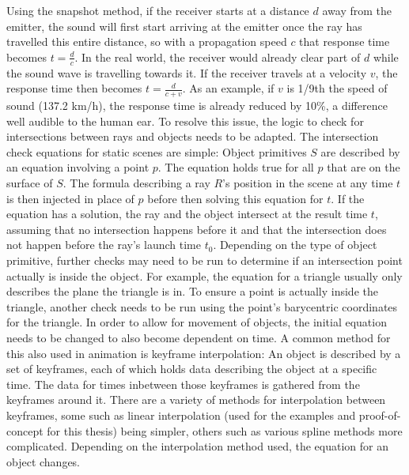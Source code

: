 Using the snapshot method, if the receiver starts at a distance \(d\) away from the emitter,
the sound will first start arriving at the emitter once the ray has travelled this entire distance,
so with a propagation speed \(c\) that response time becomes \(t = \frac{d}{c}\).
In the real world, the receiver would already clear part of \(d\) while the sound wave is travelling towards it.
If the receiver travels at a velocity \(v\), the response time then becomes \(t = \frac{d}{c + v}\).
As an example, if \(v\) is 1/9th the speed of sound (137.2 km/h),
the response time is already reduced by 10\%, a difference well audible to the human ear.
\newline
To resolve this issue, the logic to check for intersections between rays and objects needs to be adapted.
The intersection check equations for static scenes are simple:
Object primitives \(S\) are described by an equation involving a point \(p\).
The equation holds true for all \(p\) that are on the surface of \(S\).
The formula describing a ray \(R\)'s position in the scene at any time \(t\) is then injected in place of \(p\)
before then solving this equation for \(t\).
If the equation has a solution, the ray and the object intersect at the result time \(t\),
assuming that no intersection happens before it and that the intersection does not happen before the ray's launch time \(t_0\).
\newline
Depending on the type of object primitive,
further checks may need to be run to determine if an intersection point actually is inside the object.
For example, the equation for a triangle usually only describes the plane the triangle is in.
To ensure a point is actually inside the triangle,
another check needs to be run using the point's barycentric coordinates for the triangle.
\newline
In order to allow for movement of objects,
the initial equation needs to be changed to also become dependent on time.
A common method for this also used in animation is keyframe interpolation:
An object is described by a set of keyframes, each of which holds data describing the object at a specific time.
The data for times inbetween those keyframes is gathered from the keyframes around it.
There are a variety of methods for interpolation between keyframes,
some such as linear interpolation (used for the examples and proof-of-concept for this thesis) being simpler,
others such as various spline methods more complicated.
\newline
Depending on the interpolation method used, the equation for an object changes.
